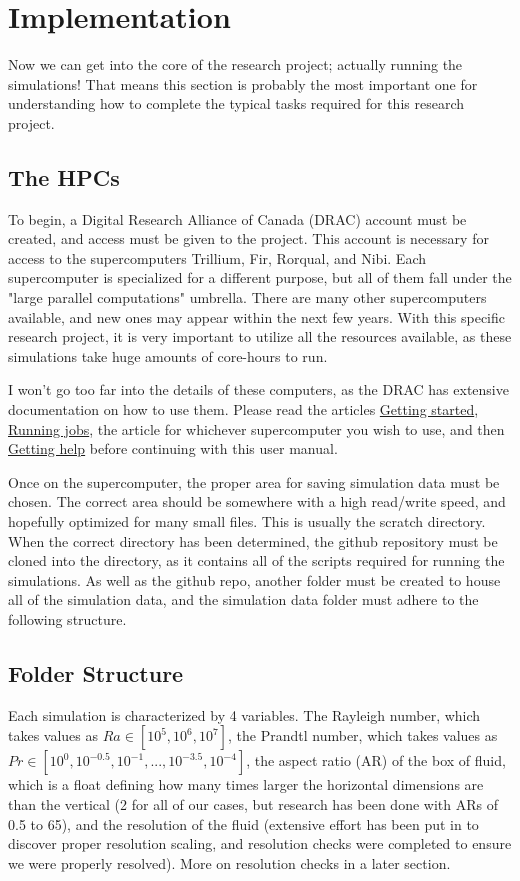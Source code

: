 \documentclass[12pt,a4paper]{report}
\begin{document}
\chapter{Implementation}
	Now we can get into the core of the research project; actually running the simulations! That means this section is probably the most important one for understanding how to complete the typical tasks required for this research project.
	
	\section{The HPCs}
		To begin, a Digital Research Alliance of Canada (DRAC) account must be created, and access must be given to the project. This account is necessary for access to the supercomputers Trillium, Fir, Rorqual, and Nibi. Each supercomputer is specialized for a different purpose, but all of them fall under the "large parallel computations" umbrella. There are many other supercomputers available, and new ones may appear within the next few years. With this specific research project, it is very important to utilize all the resources available, as these simulations take huge amounts of core-hours to run.

		I won't go too far into the details of these computers, as the DRAC has extensive documentation on how to use them. Please read the articles \href{https://docs.alliancecan.ca/wiki/Getting_started}{Getting started}, \href{https://docs.alliancecan.ca/wiki/Running_jobs}{Running jobs}, the article for whichever supercomputer you wish to use, and then \href{https://docs.alliancecan.ca/wiki/Technical_support}{Getting help} before continuing with this user manual.

		Once on the supercomputer, the proper area for saving simulation data must be chosen. The correct area should be somewhere with a high read/write speed, and hopefully optimized for many small files. This is usually the scratch directory. When the correct directory has been determined, the github repository must be cloned into the directory, as it contains all of the scripts required for running the simulations. As well as the github repo, another folder must be created to house all of the simulation data, and the simulation data folder must adhere to the following structure.

	\section{Folder Structure}
		Each simulation is characterized by 4 variables. The Rayleigh number, which takes values as $Ra \in \left[10^5, 10^6, 10^7\right]$, the Prandtl number, which takes values as $Pr \in \left[10^0, 10^{-0.5}, 10^{-1}, ..., 10^{-3.5}, 10^{-4}\right]$, the aspect ratio (AR) of the box of fluid, which is a float defining how many times larger the horizontal dimensions are than the vertical (2 for all of our cases, but research has been done with ARs of 0.5 to 65), and the resolution of the fluid (extensive effort has been put in to discover proper resolution scaling, and resolution checks were completed to ensure we were properly resolved). More on resolution checks in a later section.
\end{document}
